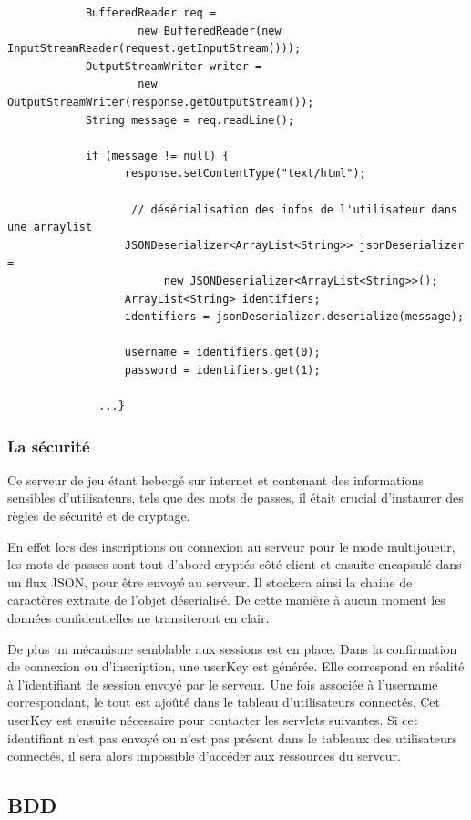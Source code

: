 		\begin{verbatim}
			BufferedReader req = 
				    new BufferedReader(new InputStreamReader(request.getInputStream()));
			OutputStreamWriter writer = 
				    new OutputStreamWriter(response.getOutputStream());
			String message = req.readLine();
			
			if (message != null) {
				  response.setContentType("text/html");
				
				   // désérialisation des infos de l'utilisateur dans une arraylist 
				  JSONDeserializer<ArrayList<String>> jsonDeserializer = 
					    new JSONDeserializer<ArrayList<String>>();
				  ArrayList<String> identifiers;
				  identifiers = jsonDeserializer.deserialize(message);
				
				  username = identifiers.get(0);
				  password = identifiers.get(1);
				  
			  ...}
		\end{verbatim}
		
		
	\subsubsection{La sécurité}
	
		Ce serveur de jeu étant hebergé sur internet et contenant des informations
		sensibles d'utilisateurs, tels que des mots de passes, il était crucial
		d'instaurer des règles de sécurité et de cryptage. 
		
		En effet lors des inscriptions ou connexion au serveur pour le mode
		multijoueur, les mots de passes sont tout d'abord cryptés côté client et
		ensuite encapsulé dans un flux JSON, pour être envoyé au serveur. Il stockera
		ainsi la chaine de caractères extraite de l'objet déserialisé. De cette
		manière à aucun moment les données confidentielles ne transiteront en clair.
		
		De plus un mécanisme semblable aux sessions est en place. Dans la
		confirmation de connexion ou d'inscription, une userKey est générée. Elle correspond en
		réalité à l'identifiant de session envoyé par le serveur. Une fois associée
		à l'username correspondant, le tout est ajoûté dans le tableau d'utilisateurs
		connectés.
		Cet userKey est ensuite nécessaire pour contacter les servlets suivantes. Si
		cet identifiant n'est pas envoyé ou n'est pas présent dans le tableaux des
		utilisateurs connectés, il sera alors impossible d'accéder aux ressources du
		serveur.
		
\subsection{BDD}

